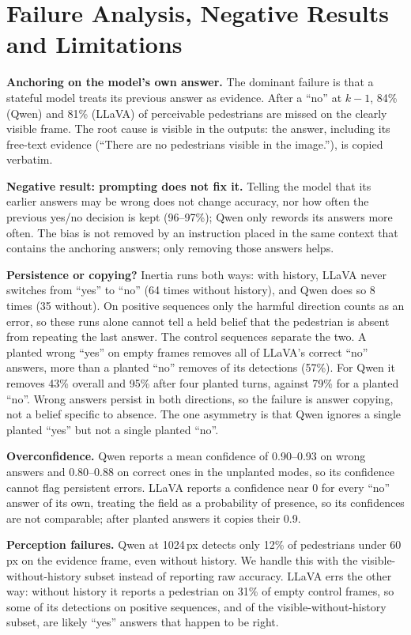 \documentclass[conference]{IEEEtran}
\begin{document}
\section{Failure Analysis, Negative Results and Limitations}

\textbf{Anchoring on the model's own answer.} The dominant failure is that a stateful model treats its previous answer as evidence. After a ``no'' at $k-1$, 84\% (Qwen) and 81\% (LLaVA) of perceivable pedestrians are missed on the clearly visible frame. The root cause is visible in the outputs: the answer, including its free-text evidence (``There are no pedestrians visible in the image.''), is copied verbatim.

\textbf{Negative result: prompting does not fix it.} Telling the model that its earlier answers may be wrong does not change accuracy, nor how often the previous yes/no decision is kept (96--97\%); Qwen only rewords its answers more often. The bias is not removed by an instruction placed in the same context that contains the anchoring answers; only removing those answers helps.

\textbf{Persistence or copying?} Inertia runs both ways: with history, LLaVA never switches from ``yes'' to ``no'' (64 times without history), and Qwen does so 8 times (35 without). On positive sequences only the harmful direction counts as an error, so these runs alone cannot tell a held belief that the pedestrian is absent from repeating the last answer. The control sequences separate the two. A planted wrong ``yes'' on empty frames removes all of LLaVA's correct ``no'' answers, more than a planted ``no'' removes of its detections (57\%). For Qwen it removes 43\% overall and 95\% after four planted turns, against 79\% for a planted ``no''. Wrong answers persist in both directions, so the failure is answer copying, not a belief specific to absence. The one asymmetry is that Qwen ignores a single planted ``yes'' but not a single planted ``no''.

\textbf{Overconfidence.} Qwen reports a mean confidence of 0.90--0.93 on wrong answers and 0.80--0.88 on correct ones in the unplanted modes, so its confidence cannot flag persistent errors. LLaVA reports a confidence near 0 for every ``no'' answer of its own, treating the field as a probability of presence, so its confidences are not comparable; after planted answers it copies their 0.9.

\textbf{Perception failures.} Qwen at 1024\,px detects only 12\% of pedestrians under 60\,px on the evidence frame, even without history. We handle this with the visible-without-history subset instead of reporting raw accuracy. LLaVA errs the other way: without history it reports a pedestrian on 31\% of empty control frames, so some of its detections on positive sequences, and of the visible-without-history subset, are likely ``yes'' answers that happen to be right.
\end{document}
